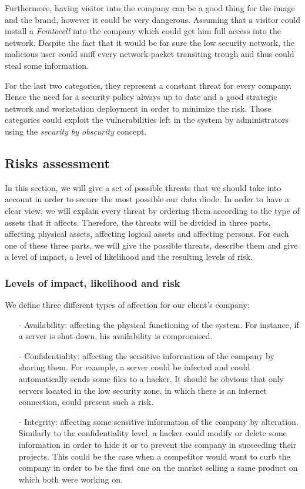 \documentclass[a4paper,10pt]{article}
\begin{document}
Furthermore, having visitor into the company can be a good thing for the image and the brand, however it could be very dangerous. Assuming that a visitor could install a \emph{Femtocell} into the company which could get him full access into the network. Despite the fact that it would be for sure the low security network, the malicious user could sniff every network packet transiting trough and thus could steal some information.

For the last two categories, they represent a constant threat for every company. Hence the need for a security policy always up to date and a good strategic network and workstation deployment in order to minimize the risk. Those categories could exploit the vulnerabilities left in the system by administrators using the \emph{security by obscurity} concept.

\subsection{Risks assessment}
In this section, we will give a set of possible threats that we should take into account in order to secure the most possible our data diode. In order to have a clear view, we will explain every threat by ordering them according to the type of assets that it affects. Therefore, the threats will be divided in three parts, affecting physical assets, affecting logical assets and affecting persons. For each one of these three parts, we will give the possible threats, describe them and give a level of impact, a level of likelihood and the resulting levels of risk.

\subsubsection{Levels of impact, likelihood and risk}
We define three different types of affection for our client's company:
\begin{enumerate}
\item[-] Availability: affecting the physical functioning of the system. For instance, if a server is shut-down, his availability is compromised.
\item[-] Confidentiality: affecting the sensitive information of the company by sharing them. For example, a server could be infected and could automatically sends some files to a hacker. It should be obvious that only servers located in the low security zone, in which there is an internet connection, could present such a risk.
\item[-] Integrity: affecting some sensitive information of the company by alteration. Similarly to the confidentiality level, a hacker could modify or delete some information in order to hide it or to prevent the company in succeeding their projects. This could be the case when a competitor would want to curb the company in order to be the first one on the market selling a same product on which both were working on.
\end{enumerate}
\end{document}
